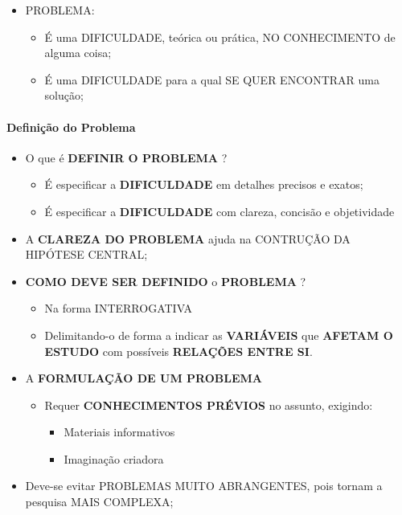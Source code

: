 \documentclass[
]{book}
\providecommand{\tightlist}{%
  \setlength{\itemsep}{0pt}\setlength{\parskip}{0pt}}
\begin{document}
\begin{itemize}
\tightlist
\item
  PROBLEMA:

  \begin{itemize}
  \tightlist
  \item
    É uma DIFICULDADE, teórica ou prática, NO CONHECIMENTO de alguma coisa;
  \item
    É uma DIFICULDADE para a qual SE QUER ENCONTRAR uma solução;
  \end{itemize}
\end{itemize}

\hypertarget{definiuxe7uxe3o-do-problema}{%
\paragraph{Definição do Problema}\label{definiuxe7uxe3o-do-problema}}

\begin{itemize}
\tightlist
\item
  O que é \textbf{DEFINIR O PROBLEMA} ?

  \begin{itemize}
  \tightlist
  \item
    É especificar a \textbf{DIFICULDADE} em detalhes precisos e exatos;
  \item
    É especificar a \textbf{DIFICULDADE} com clareza, concisão e objetividade
  \end{itemize}
\item
  A \textbf{CLAREZA DO PROBLEMA} ajuda na CONTRUÇÃO DA HIPÓTESE CENTRAL;
\item
  \textbf{COMO DEVE SER DEFINIDO} o \textbf{PROBLEMA} ?

  \begin{itemize}
  \tightlist
  \item
    Na forma INTERROGATIVA
  \item
    Delimitando-o de forma a indicar as \textbf{VARIÁVEIS} que \textbf{AFETAM O ESTUDO} com possíveis \textbf{RELAÇÕES ENTRE SI}.
  \end{itemize}
\item
  A \textbf{FORMULAÇÃO DE UM PROBLEMA}

  \begin{itemize}
  \tightlist
  \item
    Requer \textbf{CONHECIMENTOS PRÉVIOS} no assunto, exigindo:

    \begin{itemize}
    \tightlist
    \item
      Materiais informativos
    \item
      Imaginação criadora
    \end{itemize}
  \end{itemize}
\item
  Deve-se evitar PROBLEMAS MUITO ABRANGENTES, pois tornam a pesquisa MAIS COMPLEXA;
\end{itemize}
\end{document}
